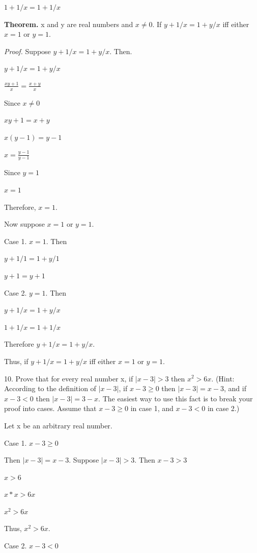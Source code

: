 \documentclass{article}
\begin{document}
$1 + 1/x = 1 + 1/x$

\vspace{20pt}

\textbf{Theorem.} x and y are real numbers and $x \neq 0$. If $y + 1/x =
1 + y/x$ iff either $x = 1$ or $y = 1$.

\textit{Proof.} Suppose $y + 1/x = 1 + y/x$. Then.

$y + 1/x = 1 + y/x$

$\frac{xy + 1}{x} = \frac{x + y}{x}$

Since $x \neq 0$

$xy + 1 = x + y$

$x(y - 1) = y - 1$

$x = \frac{y - 1}{y - 1}$

Since $y = 1$

$x = 1$

Therefore, $x = 1$.

Now suppose $x = 1$ or $y = 1$.

Case 1. $x = 1$. Then

$y + 1/1 = 1 + y/1$

$y + 1 = y + 1$

Case 2. $y = 1$. Then

$y + 1/x = 1 + y/x$

$1 + 1/x = 1 + 1/x$

Therefore $y + 1/x = 1 + y/x$.

Thus, if $y + 1/x = 1 + y/x$ iff either $x = 1$ or $y = 1$.

\vspace{30pt}

10. Prove that for every real number x, if $|x - 3| > 3$ then $x^2 > 6x$. (Hint:
According to the definition of $|x - 3|$, if $x - 3 \geq 0$ then $|x - 3| = x - 3$, and if $x - 3 < 0$ then $|x - 3| = 3 - x$. The easiest way to use this fact is to break your proof into cases. Assume that $x - 3 \geq 0$ in case 1, and $x - 3 < 0$ in case 2.)
\vspace{30pt}

Let x be an arbitrary real number.

Case 1. $x - 3 \geq 0$

Then $|x - 3| = x - 3$. Suppose $|x - 3| > 3$. Then $x - 3 > 3$

$x > 6$

$x * x > 6 x$

$x^2 > 6x$

Thus, $x^2 > 6x$.


Case 2. $x - 3 < 0$
\end{document}
